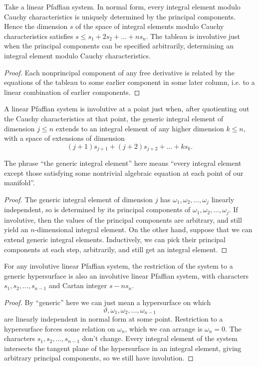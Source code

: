 \begin{lemma}\label{lemma:pick.pis}
Take a linear Pfaffian system.
In normal form, every integral element modulo Cauchy characteristics is uniquely determined by the principal components.
Hence the dimension \(s\) of the space of integral elements modulo Cauchy characteristics satisfies \(s \le s_1+2s_2+\dots+ns_n\). 
The tableau is involutive just when the principal components can be specified arbitrarily, determining an integral element modulo Cauchy characteristics.
\end{lemma}
\begin{proof}
Each nonprincipal component of any free derivative is related by the equations of the tableau to some earlier component in some later column, i.e. to a linear combination of earlier components.
\end{proof}


\begin{lemma}\label{lemma:generic}
A linear Pfaffian system is involutive at a point just when, after quotienting out the Cauchy characteristics at that point, the generic integral element of dimension \(j\le n\) extends to an integral element of any higher dimension \(k\le n\), with a space of extensions of dimension 
\[
(j+1)s_{j+1} + (j+2)s_{j+2} + \dots + ks_k.
\]
\end{lemma}
The phrase ``the generic integral element'' here means ``every integral element except those satisfying some nontrivial algebraic equation at each point of our manifold''.
\begin{proof}
The generic integral element of dimension \(j\) has \(\omega_1, \omega_2, \dots, \omega_j\) linearly independent, so is determined by its principal components of \(\omega_1, \omega_2, \dots, \omega_j\).
If involutive, then the values of the principal components are arbitrary, and still yield an \(n\)-dimensional integral element.
On the other hand, suppose that we can extend generic integral elements.
Inductively, we can pick their principal components at each step, arbitrarily, and still get an integral element.
\end{proof}


\begin{lemma}\label{lemma:restrict}
For any involutive linear Pfaffian system, the restriction of the system to a generic hypersurface is also an involutive linear Pfaffian system, with characters \(s_1,s_2,\dots,s_{n-1}\) and Cartan integer \(s-ns_n\).
\end{lemma}
\begin{proof}
By ``generic'' here we can just mean a hypersurface on which 
\[
\vartheta,\omega_1, \omega_2, \dots, \omega_{n-1}
\] 
are linearly independent in normal form at some point.
Restriction to a hypersurface forces some relation on \(\omega_n\), which we can arrange is \(\omega_n=0\).
The characters \(s_1, s_2, \dots, s_{n-1}\) don't change.
Every integral element of the system intersects the tangent plane of the hypersurface in an integral element, giving arbitrary principal components, so we still have involution.
\end{proof}

